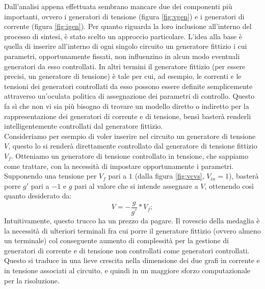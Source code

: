 Dall'analisi appena effettuata sembrano mancare due dei componenti più importanti, ovvero i generatori di tensione (figura \ref{fig:vgen}) e i generatori di corrente (figura \ref{fig:igen}). Per quanto riguarda la loro inclusione all'interno del processo di sintesi, è stato scelto un approccio particolare. L'idea alla base è quella di inserire all'interno di ogni singolo circuito un generatore fittizio i cui parametri, opportunamente fissati, non influenzino in alcun modo eventuali generatori da esso controllati. In altri termini il generatore fittizio (per essere precisi, un generatore di tensione) è tale per cui, ad esempio, le correnti e le tensioni dei generatori controllati da esso possono essere definite semplicemente attraverso un'oculata politica di assegnazione dei parametri di controllo. Questo fa sì che non vi sia più bisogno di trovare un modello diretto o indiretto per la rappresentazione dei generatori di corrente e di tensione, bensì basterà renderli intelligentemente controllati dal generatore fittizio.\\
Consideriamo per esempio di voler inserire nel circuito un generatore di tensione $V$, questo lo si renderà direttamente controllato dal generatore di tensione fittizio $V_f$. Otteniamo un generatore di tensione controllato in tensione, che sappiamo come trattare, con la necessità di impostare opportunamente i parametri. Supponendo una tensione per $V_f$ pari a $1$ (dalla figura \ref{fig:vcvs}, $V_{in} = 1$), basterà porre $g'$ pari a $-1$ e $g$ pari al valore che si intende assegnare a $V$, ottenendo così quanto desiderato da:
$$ V = -\frac{g}{g'}\ast V_{f};$$
Intuitivamente, questo trucco ha un prezzo da pagare. Il rovescio della medaglia è la necessità di ulteriori terminali fra cui porre il generatore fittizio (ovvero almeno un terminale) col conseguente aumento di complessità per la gestione di generatori di corrente e di tensione non controllati come generatori controllati. Questo si traduce in una lieve crescita nella dimensione dei due grafi in corrente e in tensione associati al circuito, e quindi in un maggiore sforzo computazionale per la risoluzione.

\paragraph{}

